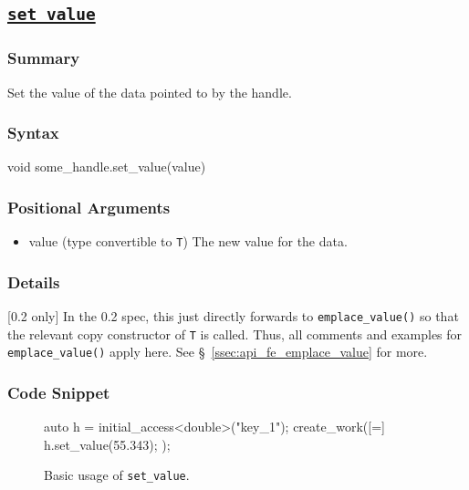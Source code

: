 \clearpage
\subsection{\underline{\texttt{set\_value}}}

\hspace{0.1cm} %
\begin{subs}
\vspace{-1.2cm}

\subsubsection{Summary} 
Set the value of the data pointed to by the handle.

\subsubsection{Syntax} 
\begin{CppCode}
void some_handle.set_value(value)
\end{CppCode}

\subsubsection{Positional Arguments}
\begin{itemize}
  \item value (type convertible to \texttt{T}) The new value for the data.
\end{itemize}


\subsubsection{Details} 
{\color{red}[0.2 only]} In the 0.2 spec, this just directly forwards to
\texttt{emplace\_value()} so that the relevant copy constructor of {\tt T} is
called.  Thus, all comments and examples for \texttt{emplace\_value()} apply
here.  See \S~\ref{ssec:api_fe_emplace_value} for more.


\subsubsection{Code Snippet} 
\begin{figure}[!h]
\begin{CppCodeNumb}
auto h = initial_access<double>("key_1");
create_work([=]{
  h.set_value(55.343);
});
\end{CppCodeNumb}
\label{fig:fe_api_set_value}
\caption{Basic usage of \texttt{set\_value}.}
\end{figure}


\end{subs}

